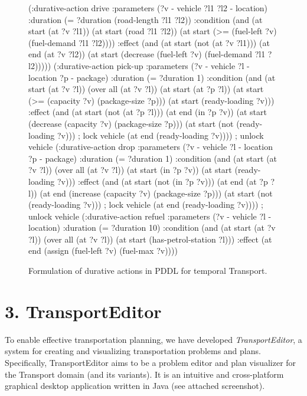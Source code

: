 \begin{figure}[p]
\begin{code}
(:durative-action drive
  :parameters (?v - vehicle ?l1 ?l2 - location)
  :duration (= ?duration (road-length ?l1 ?l2))
  :condition (and
      (at start (at ?v ?l1))
      (at start (road ?l1 ?l2))
      (at start (>= (fuel-left ?v) (fuel-demand ?l1 ?l2))))
  :effect (and
      (at start (not (at ?v ?l1)))
      (at end (at ?v ?l2))
      (at start (decrease (fuel-left ?v) (fuel-demand ?l1 ?l2)))))
(:durative-action pick-up
  :parameters (?v - vehicle ?l - location ?p - package)
  :duration (= ?duration 1)
  :condition (and
      (at start (at ?v ?l))
      (over all (at ?v ?l))
      (at start (at ?p ?l))
      (at start (>= (capacity ?v) (package-size ?p)))
      (at start (ready-loading ?v)))
  :effect (and
      (at start (not (at ?p ?l)))
      (at end (in ?p ?v))
      (at start (decrease (capacity ?v) (package-size ?p)))
      (at start (not (ready-loading ?v))) ; lock vehicle
      (at end (ready-loading ?v)))) ; unlock vehicle
(:durative-action drop
  :parameters (?v - vehicle ?l - location ?p - package)
  :duration (= ?duration 1)
  :condition (and
      (at start (at ?v ?l))
      (over all (at ?v ?l))   
      (at start (in ?p ?v))
      (at start (ready-loading ?v)))
  :effect (and (at start (not (in ?p ?v)))
      (at end (at ?p ?l))
      (at end (increase (capacity ?v) (package-size ?p)))
      (at start (not (ready-loading ?v))) ; lock vehicle
      (at end (ready-loading ?v)))) ; unlock vehicle
(:durative-action refuel
  :parameters (?v - vehicle ?l - location)
  :duration (= ?duration 10)
  :condition (and
      (at start (at ?v ?l))
      (over all (at ?v ?l))
      (at start (has-petrol-station ?l)))
  :effect
      (at end (assign (fuel-left ?v) (fuel-max ?v))))
\end{code}
\caption*{Formulation of durative actions in PDDL for temporal Transport.}
\label{code:pddl-temporal}
\end{figure}

\newpage

\section*{3. TransportEditor}\label{editor}

To enable effective transportation planning,
we have developed \textit{TransportEditor}, a system for creating and visualizing transportation problems and plans.
Specifically, TransportEditor aims to be a problem editor and plan visualizer for the Transport domain (and its variants). It is an intuitive and cross-platform graphical desktop application 
written in Java (see attached screenshot).

